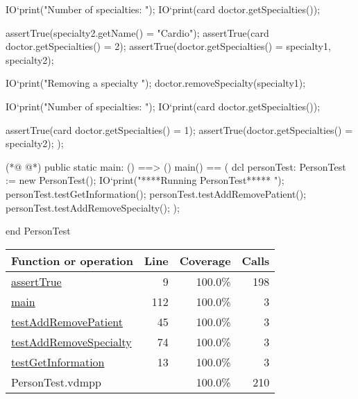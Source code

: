 \begin{vdmpp}[breaklines=true]
   IO`print("\n Number of specialties: ");
   IO`print(card doctor.getSpecialties());
   
   assertTrue(specialty2.getName() = "Cardio");
   assertTrue(card doctor.getSpecialties() = 2);
   assertTrue(doctor.getSpecialties() = {specialty1, specialty2});
   
   IO`print("\n Removing a specialty \n");
   doctor.removeSpecialty(specialty1);
   
   IO`print("\n Number of specialties: ");
   IO`print(card doctor.getSpecialties());
   
   assertTrue(card doctor.getSpecialties() = 1);
   assertTrue(doctor.getSpecialties() = {specialty2});
  );
  
(*@
\label{main:112}
@*)
 public static main: () ==> ()
   main() == (
    dcl personTest: PersonTest := new PersonTest();
    IO`print("\n *****Running PersonTest***** \n");
    personTest.testGetInformation();
    personTest.testAddRemovePatient();
    personTest.testAddRemoveSpecialty();
   );
  
end PersonTest
\end{vdmpp}
\bigskip
\begin{longtable}{|l|r|r|r|}
\hline
Function or operation & Line & Coverage & Calls \\
\hline
\hline
\hyperref[assertTrue:9]{assertTrue} & 9&100.0\% & 198 \\
\hline
\hyperref[main:112]{main} & 112&100.0\% & 3 \\
\hline
\hyperref[testAddRemovePatient:45]{testAddRemovePatient} & 45&100.0\% & 3 \\
\hline
\hyperref[testAddRemoveSpecialty:74]{testAddRemoveSpecialty} & 74&100.0\% & 3 \\
\hline
\hyperref[testGetInformation:13]{testGetInformation} & 13&100.0\% & 3 \\
\hline
\hline
PersonTest.vdmpp & & 100.0\% & 210 \\
\hline
\end{longtable}

